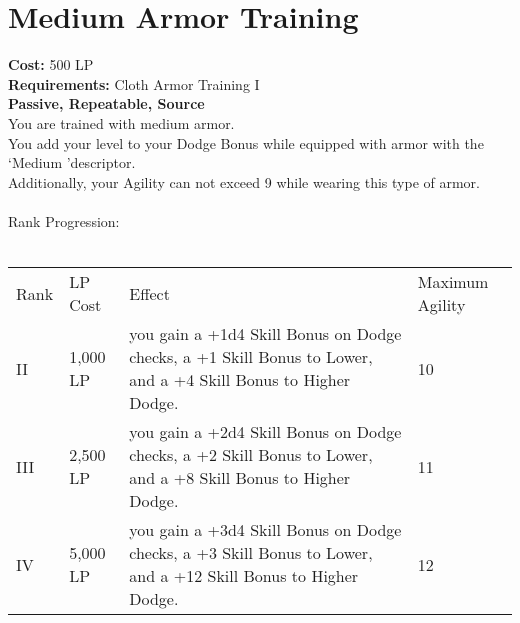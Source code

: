 \section{Medium Armor Training}\label{perk:mediumArmorTraining}
\textbf{Cost:} 500 LP\\
\textbf{Requirements:} Cloth Armor Training I\\
\textbf{Passive, Repeatable, Source}\\
You are trained with medium armor.\\
You add your level to your Dodge Bonus while equipped with armor with the \lq Medium \rq descriptor.\\
Additionally, your Agility can not exceed 9 while wearing this type of armor.\\
\\
Rank Progression:\\
\\
\begin{longtable}{l | l | l | p{9cm}}
	Rank & LP Cost & Effect & Maximum Agility
	\\
	II
	& 1,000 LP
	& you gain a +1d4 Skill Bonus on Dodge checks, a +1 Skill Bonus to Lower, and a +4 Skill Bonus to Higher Dodge.
	& 10
	\\
	III
	& 2,500 LP
	& you gain a +2d4 Skill Bonus on Dodge checks, a +2 Skill Bonus to Lower, and a +8 Skill Bonus to Higher Dodge.
	& 11
	\\
	IV
	& 5,000 LP
	& you gain a +3d4 Skill Bonus on Dodge checks, a +3 Skill Bonus to Lower, and a +12 Skill Bonus to Higher Dodge.
	& 12
	\\
\end{longtable}